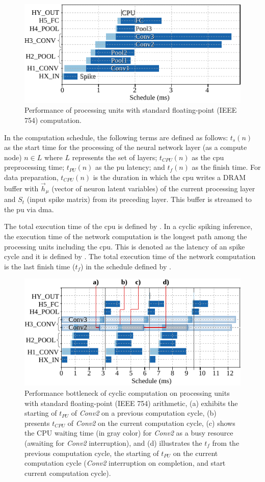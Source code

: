 \begin{figure}[b!]
	\centering
	\includegraphics[width=0.5\columnwidth]{./chapters/sbs_accelerator/figures/latency_pu_fp.pdf}
	\caption{Performance of processing units with standard floating-point (IEEE 754) computation.}
	\label{fig:latency_pu_fp}
\end{figure}

In the computation schedule, the following terms are defined as follows: $t_s(n)$ as the start time for the processing of the neural network layer (as a compute node) $n\in L$ where $L$ represents the set of layers; $t_{CPU}(n)$ as the \gls{cpu} preprocessing time; $t_{PU}(n)$ as the \gls{pu} latency; and $t_f(n)$ as the finish time. For data preparation, $t_{CPU}(n)$ is the duration in which the \gls{cpu} writes a DRAM buffer with $\vec{h}_\mu$ (vector of neuron latent variables) of the current processing layer and $S_t$ (input spike matrix) from its preceding layer. This buffer is streamed to the \gls{pu} via \gls{dma}.

The total execution time of the \gls{cpu} is defined by . In a cyclic spiking inference, the execution time of the network computation is the longest path among the processing units including the \gls{cpu}. This is denoted as the latency of an spike cycle and it is defined by . The total execution time of the network computation is the last finish time ($t_f$) in the schedule defined by .

\begin{figure}[b!]
	\centering
	\includegraphics[width=0.5\columnwidth]{./chapters/sbs_accelerator/figures/latency_fp_cycle.pdf}
	\caption{Performance bottleneck of cyclic computation on processing units with standard floating-point (IEEE 754) arithmetic, (a) exhibits the starting of $t_{PU}$ of \emph{Conv2} on a previous computation cycle, (b) presents $t_{CPU}$ of \emph{Conv2} on the current computation cycle, (c) shows the CPU waiting time (in gray color) for \emph{Conv2} as a busy resource (awaiting for \emph{Conv2} interruption), and (d) illustrates the $t_{f}$ from the previous computation cycle, the starting of $t_{PU}$ on the current computation cycle (\emph{Conv2} interruption on completion, and start current computation cycle).}
	\label{fig:latency_pu_fp_cycle}
\end{figure}

